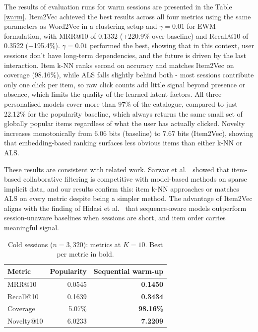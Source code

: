 \documentclass[a4paper,oneside,12pt]{book}
\begin{document}
The results of evaluation runs for warm sessions are presented in the Table \ref{warm}. Item2Vec achieved the best results across all four metrics using the same parameters as Word2Vec in a clustering setup and $\gamma = 0.01$ for EWM formulation, with MRR@10 of 0.1332 (+220.9\% over baseline) and Recall@10 of 0.3522 (+195.4\%). $\gamma = 0.01$ performed the best, showing that in this context, user sessions don't have long-term dependencies, and the future is driven by the last interaction.
Item k-NN ranks second on accuracy and matches Item2Vec on coverage
(98.16\%), while ALS falls slightly behind both - most sessions contribute
only one click per item, so raw click counts add little signal beyond
presence or absence, which limits the quality of the learned latent factors.
All three personalised models cover more than 97\% of the catalogue,
compared to just 22.12\% for the popularity baseline, which always returns
the same small set of globally popular items regardless of what the user
has actually clicked.
Novelty increases monotonically from 6.06 bits (baseline) to 7.67 bits
(Item2Vec), showing that embedding-based ranking surfaces less obvious
items than either k-NN or ALS\@.

These results are consistent with related work. Sarwar et
al.~\cite{sarwar2001item} showed that item-based collaborative filtering
is competitive with model-based methods on sparse implicit data, and our
results confirm this: item k-NN approaches or matches ALS on every metric
despite being a simpler method.
The advantage of Item2Vec aligns with the finding of Hidasi et
al.~\cite{hidasi2016session} that sequence-aware models outperform
session-unaware baselines when sessions are short, and item order carries
meaningful signal.

\begin{table}[H]
\centering
\caption{Cold sessions ($n = 3{,}320$): metrics at $K = 10$.
         Best per metric in bold.}
\label{tab:cold_results}
\begin{tabular}{lrr}
\hline
Metric      & Popularity & Sequential warm-up \\
\hline
MRR@10      & 0.0545     & \textbf{0.1450} \\
Recall@10   & 0.1639     & \textbf{0.3434} \\
Coverage    & 5.07\%     & \textbf{98.16\%} \\
Novelty@10  & 6.0233     & \textbf{7.2209} \\
\hline
\end{tabular}
\label{Cold}
\end{table}
\end{document}

